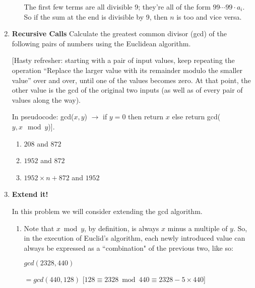 \documentclass[11pt]{article}
\newif\ifsolutions
\begin{document}
\begin{enumerate}
\begin{enumerate}
       The first few terms are all divisible 9; they're all of the form $99\cdots 99 \cdot a_i$.
       So if the sum at the end is divisible by 9, then $n$ is too and vice versa. 
\end{enumerate}
\fi

\item {\bf Recursive Calls}  Calculate the greatest common divisor (gcd) of the following pairs of numbers using the Euclidean algorithm.

[Hasty refresher: starting with a pair of input values, keep repeating the operation ``Replace the larger value with its remainder modulo the smaller value'' over and over, until one of the values becomes zero. At that point, the other value is the gcd of the original two inputs (as well as of every pair of values along the way).

In pseudocode: gcd($x, y$) $\rightarrow$ if $y = 0$ then return $x$ else return gcd($y, x\mod y$)].

\begin{enumerate}
\item $208$ and $872$
\item $1952$ and $872$
\item $1952 \times n + 872$ and $1952$
\end{enumerate}

\ifsolutions
\textbf{Motivation for Problem:} This is supposed to be a quick refresher for the gcd algorithm, and attempts to show how gcd creates recursive calls of other gcd that we can use to shortcut.

\textbf{Solutions:} 8 for all of these. The first answer students should calculate by hand, the second answer will reduce to the first after one step, and the third answer will reduce to the second in one step.  \fi

\item {\bf Extend it!}

In this problem we will consider extending the gcd algorithm.

\begin{enumerate}

\item Note that $x \bmod y$, by definition, is always $x$ minus a multiple of $y$. So, in the execution of Euclid's algorithm, each newly introduced value can always be expressed as a ``combination" of the previous two, like so:

$ gcd(2328, 440)$ 

$= gcd(440, 128)$ [$128 \equiv 2328 \bmod{440} \equiv 2328 - 5 \times 440$] 


\end{enumerate}
\end{enumerate}
\end{document}
